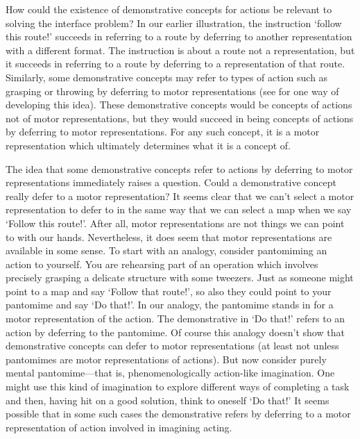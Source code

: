 \documentclass[12pt,\papersize]{extarticle}
\begin{document}
How could the existence of demonstrative concepts for actions be relevant  to solving the interface problem? In our earlier illustration, the instruction `follow this route!' succeeds in referring to a route by deferring to another representation with a different format. The instruction is about a route not a representation, but it succeeds in referring to a route by deferring to a representation of that route. Similarly, some demonstrative concepts may refer to types of action such as grasping or throwing by deferring to motor representations (see \citet{levine:2010_demonstrative} for one way of developing this idea). These demonstrative concepts would be concepts of actions not of motor representations, but they would succeed in being concepts of actions by deferring to motor representations. For any such concept, it is a motor representation which ultimately determines what it is a concept of.

The idea that some demonstrative concepts refer to actions by deferring to motor representations immediately raises a question. Could a demonstrative concept really defer to a motor representation? It seems clear that we can't select a motor representation to defer to in the same way that we can select a map when we say `Follow this route!'. After all, motor representations are not things we can point to with our hands. Nevertheless, it does seem that motor representations are available in some sense. To start with an analogy, consider pantomiming an action to yourself. You are rehearsing part of an operation which involves precisely grasping a delicate structure with some tweezers. Just as someone might point to a map and say `Follow that route!', so also they could point to your pantomime and say `Do that!'. In our analogy, the pantomime stands in for a motor representation of the action.  The demonstrative in `Do that!' refers to an action by deferring to the pantomime. Of course this analogy doesn't show that demonstrative concepts can defer to motor representations (at least not unless pantomimes are motor representations of actions). But now consider purely mental pantomime---that is, phenomenologically action-like imagination. One might use this kind of imagination to explore different ways of completing a task and then, having hit on a good solution, think to oneself `Do that!' It seems possible that in some such cases the demonstrative refers by deferring to a motor representation of action involved in imagining acting.
\end{document}
